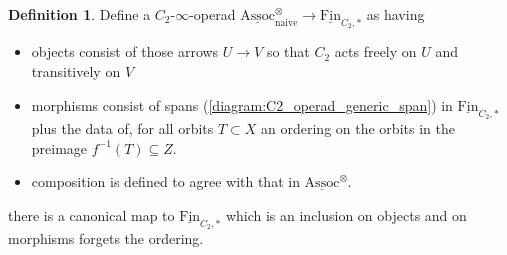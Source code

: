 \documentclass{article}
\theoremstyle{definition}
\newtheorem{definition}[equation]{Definition}
\newcommand{\Lucy}[1]{\todo[color=cyan!30]{\footnotesize L: #1}}
\begin{document}
\begin{definition}\label{defn:naive_assoc_param_operad}
    Define a $ C_2 $-$ \infty $-operad $ \underline{\mathrm{Assoc}}_{\mathrm{naive}}^\otimes \to \underline{\mathrm{Fin}}_{C_2, *} $ as having 
    \begin{itemize}
        \item objects consist of those arrows $ U \to V $ so that $ C_2 $ acts freely on $ U $ and transitively on $ V $ 
        \item morphisms consist of spans (\ref{diagram:C2_operad_generic_span}) in $ \underline{\mathrm{Fin}}_{C_2, *} $ plus the data of, for all orbits $ T \subset X $ an ordering on the orbits in the preimage $ f^{-1}(T) \subseteq Z $. 
        \item composition is defined to agree with that in $ \underline{\mathrm{Assoc}}^\otimes $. %
    \end{itemize}
    there is a canonical map to $ \underline{\mathrm{Fin}}_{C_2, *} $ which is an inclusion on objects and on morphisms forgets the ordering. 
\end{definition}
\end{document}
